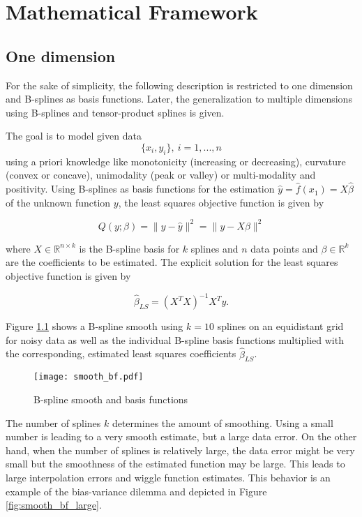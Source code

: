 

\chapter{Mathematical Framework}

\section{One dimension} \label{1D}
	For the sake of simplicity, the following description is restricted to one dimension and B-splines as basis functions. Later, the generalization to multiple dimensions using B-splines and tensor-product splines is given. 

	The goal is to model given data $$\{x_i, y_i\}, \ i = 1, ..., n$$ using a priori knowledge like monotonicity (increasing or decreasing), curvature (convex or concave), unimodality (peak or valley) or multi-modality and positivity. Using B-splines as basis functions for the estimation $\hat y =  \hat f(x_1) = X\hat \beta$ of the unknown function $y$, the least squares objective function is given by

$$Q(y;\beta) = \lVert y - \hat y\rVert^2 = \lVert y - X\beta\rVert^2 $$

where $X \in \mathbb{R}^{n \times k}$ is the B-spline basis for $k$ splines and $n$ data points and $\beta \in \mathbb{R}^k$ are the coefficients to be estimated. The explicit solution for the least squares objective function is given by

$$\hat \beta_{LS}= (X^TX)^{-1}X^T y.$$

Figure \ref{fig:smooth_bf} shows a B-spline smooth using $k=10$ splines on an equidistant grid for noisy data as well as the individual B-spline basis functions multiplied with the corresponding, estimated least squares coefficients $\hat \beta_{LS}$.

\begin{figure}[H]
	\centering
	\texttt{[image: smooth\_bf.pdf]}
	\caption{B-spline smooth and basis functions}
	\label{fig:smooth_bf}
\end{figure}


The number of splines $k$ determines the amount of smoothing. Using a small number is leading to a very smooth estimate, but a large data error. On the other hand, when the number of splines is relatively large, the data error might be very small but the smoothness of the estimated function may be large. This leads to large interpolation errors and wiggle function estimates. This behavior is an example of the bias-variance dilemma and depicted in Figure \ref{fig:smooth_bf_large}. \cite{sammut2011}


